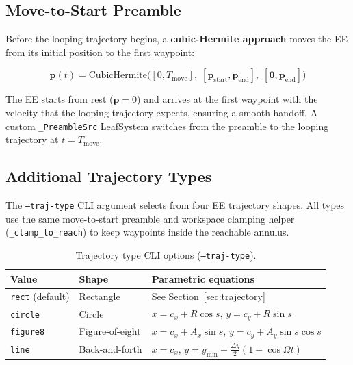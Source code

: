 \documentclass[11pt,a4paper]{article}
\begin{document}
\subsection{Move-to-Start Preamble}

Before the looping trajectory begins, a \textbf{cubic-Hermite approach} moves the EE from its initial position to the first waypoint:

\begin{equation}
    \bm{p}(t) = \mathrm{CubicHermite}\!\bigl(
        [0, T_{\mathrm{move}}],\;
        [\bm{p}_{\mathrm{start}}, \bm{p}_{\mathrm{end}}],\;
        [\bm{0}, \dot{\bm{p}}_{\mathrm{end}}]
    \bigr)
\end{equation}

The EE starts from rest ($\dot{\bm{p}} = 0$) and arrives at the first waypoint with the velocity that the looping trajectory expects, ensuring a smooth handoff.  A custom \texttt{\_PreambleSrc} LeafSystem switches from the preamble to the looping trajectory at $t = T_{\mathrm{move}}$.


\subsection{Additional Trajectory Types}
\label{sec:traj_types}

The \texttt{--traj-type} CLI argument selects from four EE trajectory shapes.
All types use the same move-to-start preamble and workspace clamping helper
(\texttt{\_clamp\_to\_reach}) to keep waypoints inside the reachable annulus.

\begin{table}[H]
\centering
\caption{Trajectory type CLI options (\texttt{--traj-type}).}
\begin{tabular}{llp{7.5cm}}
\toprule
\textbf{Value} & \textbf{Shape} & \textbf{Parametric equations} \\
\midrule
\texttt{rect} (default) & Rectangle     & See Section~\ref{sec:trajectory} \\
\texttt{circle}         & Circle        & $x = c_x + R\cos s$, $y = c_y + R\sin s$ \\
\texttt{figure8}        & Figure-of-eight & $x = c_x + A_x\sin s$, $y = c_y + A_y\sin s\cos s$ \\
\texttt{line}           & Back-and-forth & $x = c_x$, $y = y_{\min} + \tfrac{\Delta y}{2}(1-\cos\Omega t)$ \\
\bottomrule
\end{tabular}
\end{table}
\end{document}
